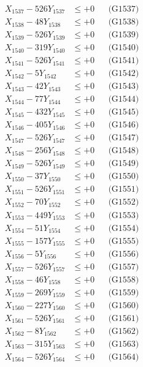 \documentclass[a4paper,10pt]{article}
\begin{document}
{\begin{align}
X_{1537} - 526Y_{1537} &\leq +0 && \text{(G1537)} \\
X_{1538} - 48Y_{1538} &\leq +0 && \text{(G1538)} \\
X_{1539} - 526Y_{1539} &\leq +0 && \text{(G1539)} \\
X_{1540} - 319Y_{1540} &\leq +0 && \text{(G1540)} \\
\allowbreak
X_{1541} - 526Y_{1541} &\leq +0 && \text{(G1541)} \\
X_{1542} - 5Y_{1542} &\leq +0 && \text{(G1542)} \\
X_{1543} - 42Y_{1543} &\leq +0 && \text{(G1543)} \\
X_{1544} - 77Y_{1544} &\leq +0 && \text{(G1544)} \\
X_{1545} - 432Y_{1545} &\leq +0 && \text{(G1545)} \\
X_{1546} - 405Y_{1546} &\leq +0 && \text{(G1546)} \\
X_{1547} - 526Y_{1547} &\leq +0 && \text{(G1547)} \\
X_{1548} - 256Y_{1548} &\leq +0 && \text{(G1548)} \\
X_{1549} - 526Y_{1549} &\leq +0 && \text{(G1549)} \\
X_{1550} - 37Y_{1550} &\leq +0 && \text{(G1550)} \\
\allowbreak
X_{1551} - 526Y_{1551} &\leq +0 && \text{(G1551)} \\
X_{1552} - 70Y_{1552} &\leq +0 && \text{(G1552)} \\
X_{1553} - 449Y_{1553} &\leq +0 && \text{(G1553)} \\
X_{1554} - 51Y_{1554} &\leq +0 && \text{(G1554)} \\
X_{1555} - 157Y_{1555} &\leq +0 && \text{(G1555)} \\
X_{1556} - 5Y_{1556} &\leq +0 && \text{(G1556)} \\
X_{1557} - 526Y_{1557} &\leq +0 && \text{(G1557)} \\
X_{1558} - 46Y_{1558} &\leq +0 && \text{(G1558)} \\
X_{1559} - 269Y_{1559} &\leq +0 && \text{(G1559)} \\
X_{1560} - 227Y_{1560} &\leq +0 && \text{(G1560)} \\
\allowbreak
X_{1561} - 526Y_{1561} &\leq +0 && \text{(G1561)} \\
X_{1562} - 8Y_{1562} &\leq +0 && \text{(G1562)} \\
X_{1563} - 315Y_{1563} &\leq +0 && \text{(G1563)} \\
X_{1564} - 526Y_{1564} &\leq +0 && \text{(G1564)} \\

\end{align}}
\end{document}
